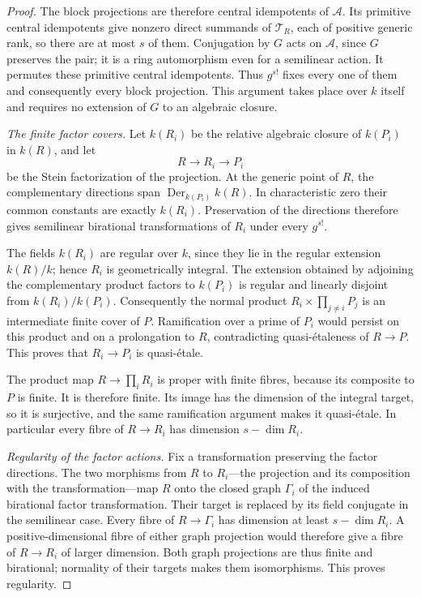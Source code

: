 \begin{proof}
The block projections are therefore central idempotents of
$\mathcal A$.  Its primitive central idempotents give nonzero
direct summands of $\mathcal T_R$, each of positive generic rank,
so there are at most $s$ of them.  Conjugation by $G$ acts on
$\mathcal A$, since $G$ preserves the pair; it is a ring
automorphism even for a semilinear action.  It permutes these
primitive central idempotents.  Thus $g^{s!}$ fixes every one of
them and consequently every block projection.  This argument takes
place over $k$ itself and requires no extension of $G$ to an
algebraic closure.

\smallskip\noindent\emph{The finite factor covers.}
Let $k(R_i)$ be the relative algebraic closure of $k(P_i)$ in
$k(R)$, and let
\[
                         R\longrightarrow R_i\longrightarrow P_i
\]
be the Stein factorization of the projection.  At the generic point
of $R$, the complementary directions span
$\operatorname{Der}_{k(P_i)}k(R)$.  In characteristic zero their
common constants are exactly $k(R_i)$.  Preservation of the
directions therefore gives semilinear birational transformations of
$R_i$ under every $g^{s!}$.

The fields $k(R_i)$ are regular over $k$, since they lie in the
regular extension $k(R)/k$; hence $R_i$ is geometrically integral.
The extension obtained by adjoining the complementary product
factors to $k(P_i)$ is regular and linearly disjoint from
$k(R_i)/k(P_i)$.  Consequently the normal product
$R_i\times\prod_{j\ne i}P_j$ is an intermediate finite cover of
$P$.  Ramification over a prime of $P_i$ would persist on this
product and on a prolongation to $R$, contradicting
quasi-\'etaleness of $R\to P$.  This proves that $R_i\to P_i$
is quasi-\'etale.

The product map $R\to\prod_iR_i$ is proper with finite fibres,
because its composite to $P$ is finite.  It is therefore finite.
Its image has the dimension of the integral target, so it is
surjective, and the same ramification argument makes it
quasi-\'etale.  In particular every fibre of $R\to R_i$ has
dimension $s-\dim R_i$.

\smallskip\noindent\emph{Regularity of the factor actions.}
Fix a transformation preserving the factor directions.  The two
morphisms from $R$ to $R_i$---the projection and its composition
with the transformation---map $R$ onto the closed graph
$\Gamma_i$ of the induced birational factor transformation.
Their target is replaced by its field conjugate in the semilinear
case.  Every fibre of $R\to\Gamma_i$ has dimension at least
$s-\dim R_i$.  A positive-dimensional fibre of either graph
projection would therefore give a fibre of $R\to R_i$ of larger
dimension.  Both graph projections are thus finite and birational;
normality of their targets makes them isomorphisms.  This proves
regularity.


\end{proof}
